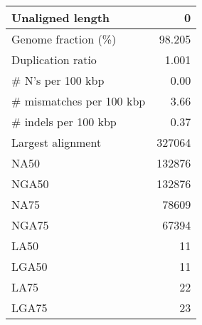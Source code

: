 \documentclass[12pt,a4paper]{article}
\begin{document}
\begin{table}[ht]
\begin{center}
\begin{tabular}{|l*{1}{|r}|}
Unaligned length & 0 \\ \hline
Genome fraction (\%) & 98.205 \\ \hline
Duplication ratio & 1.001 \\ \hline
\# N's per 100 kbp & 0.00 \\ \hline
\# mismatches per 100 kbp & 3.66 \\ \hline
\# indels per 100 kbp & 0.37 \\ \hline
Largest alignment & 327064 \\ \hline
NA50 & 132876 \\ \hline
NGA50 & 132876 \\ \hline
NA75 & 78609 \\ \hline
NGA75 & 67394 \\ \hline
LA50 & 11 \\ \hline
LGA50 & 11 \\ \hline
LA75 & 22 \\ \hline
LGA75 & 23 \\ \hline
\end{tabular}
\end{center}
\end{table}
\end{document}
